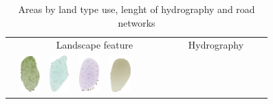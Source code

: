 \documentclass[portrait,a0]{sciposter}
\begin{document}
\begin{minipage}[b]{\textwidth}
\begin{multicols}{3}
    
    \footnotesize
    \begin{table}[]
      \begin{center}
        \captionsetup{type=table}
        \caption{Areas by land type use, lenght of hydrography and road networks }\label{tab:stats}
        \setcellgapes{2pt}
        \begin{tabular}{l|cccccccc|c|ccccc|c|r}
          & \multicolumn{8}{c|}{Landscape feature}
          & 
          & \multicolumn{5}{c|}{Hydrography}
          &
          &\\
          &\includegraphics[height=40pt]{gfx/foret_couleur.png}
          &\includegraphics[height=40pt]{gfx/marais_couleur.png}
          &\includegraphics[height=40pt]{gfx/vigne_couleur.png}
          &\includegraphics[height=40pt]{gfx/landes_couleur.png}

\end{tabular}
\end{center}
\end{table}
\end{multicols}
\end{minipage}
\end{document}
